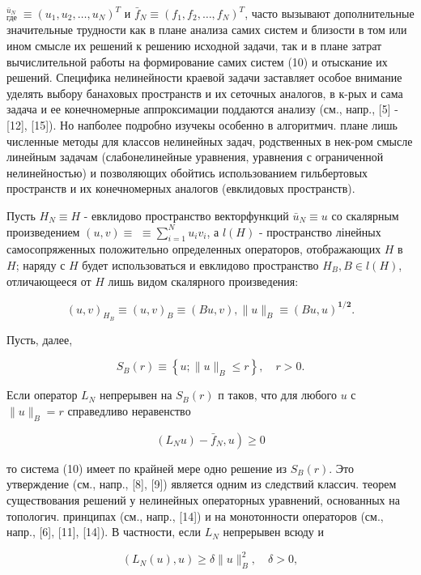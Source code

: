 \documentclass[10pt]{article}
\begin{document}
${ }_{\text {где }}^{\bar{u}_{N}} \equiv\left(u_{1}, u_{2}, \ldots, u_{N}\right)^{T}$ и $\bar{f}_{N} \equiv\left(f_{1}, f_{2}, \ldots, f_{N}\right)^{T}$, часто вызывают дополнительные значительные трудности как в плане анализа самих систем и близости в том или ином смысле их решений к решению исходной задачи, так и в плане затрат вычислительной работы на формирование самих систем (10) и отыскание их решений. Специфика нелинейности краевой задачи заставляет особое внимание уделять выбору банаховых пространств и их сеточных аналогов, в к-рых и сама задача и ее конечномерные аппроксимации поддаются анализу (см., напр., [5] - [12], [15]). Но напболее подробно изучекы особенно в алгоритмич. плане лишь численные методы для классов нелинейных задач, родственных в нек-ром смысле линейным задачам (слабонелинейные уравнения, уравнения с ограниченной нелинейностью) и позволяющих обойтись использованием гильбертовых пространств и их конечномерных аналогов (евклидовых пространств).



Пусть $H_{N} \equiv H$ - евклидово пространство векторфункций $\bar{u}_{N} \equiv u$ со скалярным произведением $(u, v) \equiv$ $\equiv \sum_{i=1}^{N} u_{i} v_{i}$, а $l(H)$ - пространство лінейных самосопряженных положительно определенных операторов, отображающих $H$ в $H$; наряду с $H$ будет использоваться и евклидово пространство $H_{B}, B \in l(H)$, отличающееся от $H$ лишь видом скалярного произведения:



\[

(u, v)_{H_{B}} \equiv(u, v)_{B} \equiv(B u, v),\|u\|_{B} \equiv(B u, u)^{\mathbf{1 / 2}} .

\]



Пусть, далее,



\[

S_{B}(r) \equiv\left\{u ;\|u\|_{B} \leqslant r\right\}, \quad r>0 .

\]



Если оператор $L_{N}$ непрерывен на $S_{B}(r)$ п таков, что для любого $u$ с $\|u\|_{B}=r$ справедливо неравенство



\[

\left.\left(L_{N} u\right)-\bar{f}_{N}, u\right) \geqslant 0

\]



то система (10) имеет по крайней мере одно решение из $S_{B}(r)$. Это утверждение (см., напр., [8], [9]) является одним из следствий классич. теорем существования решений у нелинейных операторных уравнений, основанных на топологич. принципах (см., напр., [14]) и на монотонности операторов (см., напр., [6], [11], [14]). В частности, если $L_{N}$ непрерывен всюду и



\[

\left(L_{N}(u), u\right) \geqslant \delta\|u\|_{B}^{2}, \quad \delta>0,

\]
\end{document}

